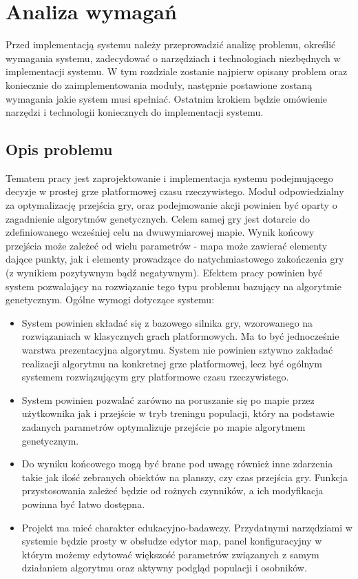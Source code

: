 \section{Analiza wymagań}
Przed implementacją systemu należy przeprowadzić analizę problemu, określić wymagania systemu, zadecydować o narzędziach i technologiach niezbędnych w implementacji systemu.
W tym rozdziale zostanie najpierw opisany problem oraz koniecznie do zaimplementowania moduły, następnie postawione zostaną wymagania jakie system musi spełniać. Ostatnim krokiem będzie omówienie narzędzi i technologii koniecznych do implementacji systemu.
\subsection{Opis problemu}
\begin{par}
	Tematem pracy jest zaprojektowanie i implementacja systemu podejmującego decyzje w prostej grze platformowej czasu rzeczywistego.
	Moduł odpowiedzialny za optymalizację przejścia gry, oraz podejmowanie akcji powinien być oparty o zagadnienie algorytmów genetycznych.
	Celem samej gry jest dotarcie do zdefiniowanego wcześniej celu na dwuwymiarowej mapie. Wynik końcowy przejścia może zależeć od wielu parametrów - mapa może zawierać elementy dające punkty, jak i elementy prowadzące do natychmiastowego zakończenia gry (z wynikiem pozytywnym bądź negatywnym).
	Efektem pracy powinien być system pozwalający na rozwiązanie tego typu problemu bazujący na algorytmie genetycznym.
	\newline
	Ogólne wymogi dotyczące systemu:
	\begin{itemize}
		\item
			System powinien składać się z bazowego silnika gry, wzorowanego na rozwiązaniach w klasycznych grach platformowych. Ma to być jednocześnie warstwa prezentacyjna algorytmu.
			System nie powinien sztywno zakładać realizacji algorytmu na konkretnej grze platformowej, lecz być ogólnym systemem rozwiązującym gry platformowe czasu rzeczywistego.
		\item
			System powinien pozwalać zarówno na poruszanie się po mapie przez użytkownika jak i przejście w tryb treningu populacji, który na podstawie zadanych parametrów optymalizuje przejście po mapie algorytmem genetycznym.
		\item
			Do wyniku końcowego mogą być brane pod uwagę również inne zdarzenia takie jak ilość zebranych obiektów na planszy, czy czas przejścia gry.
			Funkcja przystosowania zależeć będzie od rożnych czynników, a ich modyfikacja powinna być łatwo dostępna.
		\item
			Projekt ma mieć charakter edukacyjno-badawczy. Przydatnymi narzędziami w systemie będzie prosty w obsłudze edytor map, panel konfiguracyjny w którym możemy edytować większość parametrów związanych z samym działaniem algorytmu oraz aktywny podgląd populacji i osobników.
	\end{itemize}
\end{par}

